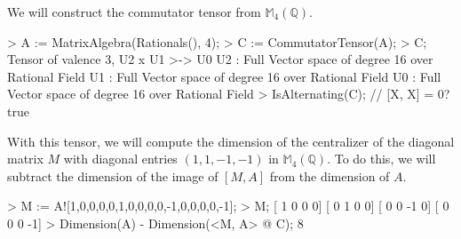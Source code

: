 \begin{example}[CommutatorFromAlgebra]

We will construct the commutator tensor from $\mathbb{M}_4(\mathbb{Q})$. 
\begin{code}
> A := MatrixAlgebra(Rationals(), 4);
> C := CommutatorTensor(A);
> C;
Tensor of valence 3, U2 x U1 >-> U0
U2 : Full Vector space of degree 16 over Rational Field
U1 : Full Vector space of degree 16 over Rational Field
U0 : Full Vector space of degree 16 over Rational Field
> IsAlternating(C); // [X, X] = 0?
true
\end{code}

With this tensor, we will compute the dimension of the centralizer of the diagonal matrix $M$ with diagonal entries $(1,1,-1,-1)$ in $\mathbb{M}_4(\mathbb{Q})$. 
To do this, we will subtract the dimension of the image of $[M, A]$ from the dimension of $A$. 

\begin{code}
> M := A![1,0,0,0,0,1,0,0,0,0,-1,0,0,0,0,-1];
> M;
[ 1  0  0  0]
[ 0  1  0  0]
[ 0  0 -1  0]
[ 0  0  0 -1]
> Dimension(A) - Dimension(<M, A> @ C);
8
\end{code}
\end{example}

